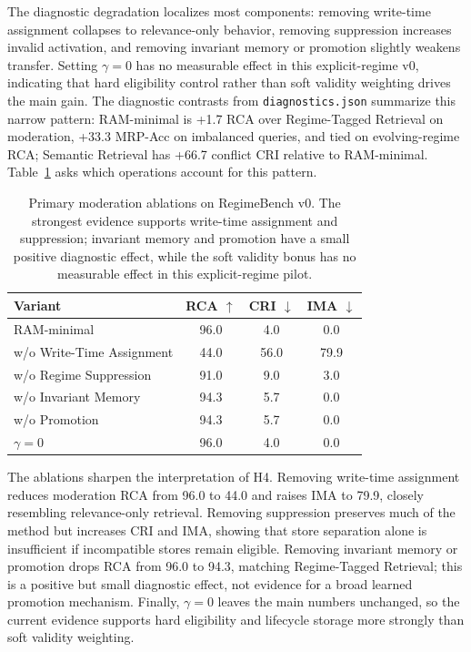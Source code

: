 \documentclass{article} %
\begin{document}
The diagnostic degradation localizes most components: removing write-time assignment collapses to relevance-only behavior, removing suppression increases invalid activation, and removing invariant memory or promotion slightly weakens transfer.
Setting $\gamma=0$ has no measurable effect in this explicit-regime v0, indicating that hard eligibility control rather than soft validity weighting drives the main gain.
The diagnostic contrasts from \texttt{diagnostics.json} summarize this narrow pattern: RAM-minimal is +1.7 RCA over Regime-Tagged Retrieval on moderation, +33.3 MRP-Acc on imbalanced queries, and tied on evolving-regime RCA; Semantic Retrieval has +66.7 conflict CRI relative to RAM-minimal.
Table~\ref{tab:ablation_results_template} asks which operations account for this pattern.

\begin{table}[t]
\centering
\small
\begin{tabular}{lccc}
\toprule
\textbf{Variant} &
\textbf{RCA $\uparrow$} &
\textbf{CRI $\downarrow$} &
\textbf{IMA $\downarrow$} \\
\midrule
RAM-minimal & 96.0 & 4.0 & 0.0 \\
w/o Write-Time Assignment & 44.0 & 56.0 & 79.9 \\
w/o Regime Suppression & 91.0 & 9.0 & 3.0 \\
w/o Invariant Memory & 94.3 & 5.7 & 0.0 \\
w/o Promotion & 94.3 & 5.7 & 0.0 \\
$\gamma=0$ & 96.0 & 4.0 & 0.0 \\
\bottomrule
\end{tabular}
\caption{Primary moderation ablations on RegimeBench v0. The strongest evidence supports write-time assignment and suppression; invariant memory and promotion have a small positive diagnostic effect, while the soft validity bonus has no measurable effect in this explicit-regime pilot.}
\label{tab:ablation_results_template}
\end{table}

The ablations sharpen the interpretation of H4.
Removing write-time assignment reduces moderation RCA from 96.0 to 44.0 and raises IMA to 79.9, closely resembling relevance-only retrieval.
Removing suppression preserves much of the method but increases CRI and IMA, showing that store separation alone is insufficient if incompatible stores remain eligible.
Removing invariant memory or promotion drops RCA from 96.0 to 94.3, matching Regime-Tagged Retrieval; this is a positive but small diagnostic effect, not evidence for a broad learned promotion mechanism.
Finally, $\gamma=0$ leaves the main numbers unchanged, so the current evidence supports hard eligibility and lifecycle storage more strongly than soft validity weighting.
\end{document}

